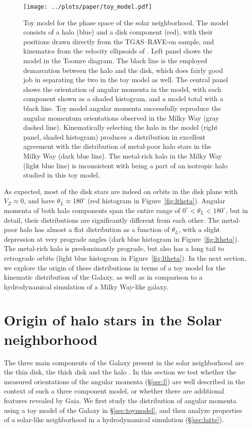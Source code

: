 \documentclass[apj, twocolappendix, numberedappendix, appendixfloats]{emulateapj}
\begin{document}
\begin{figure*}
\begin{center}
\texttt{[image: ../plots/paper/toy\_model.pdf]}
\caption{Toy model for the phase space of the solar neighborhood.
The model consists of a halo (blue) and a disk component (red), with their positions drawn directly from the TGAS--RAVE-on sample, and kinematics from the velocity ellipsoids of \citet{bensby2003}.
Left panel shows the model in the Toomre diagram.
The black line is the employed demarcation between the halo and the disk, which does fairly good job in separating the two in the toy model as well.
The central panel shows the orientation of angular momenta in the model, with each component shown as a shaded histogram, and a model total with a black line.
Toy model angular momenta successfully reproduce the angular momentum orientations observed in the Milky Way (gray dashed line).
Kinematically selecting the halo in the model (right panel, shaded histogram) produces a distribution in excellent agreement with the distribution of metal-poor halo stars in the Milky Way (dark blue line).
The metal-rich halo in the Milky Way (light blue line) is inconsistent with being a part of an isotropic halo studied in this toy model.}
\label{fig:toy}
\end{center}
\end{figure*}

As expected, most of the disk stars are indeed on orbits in the disk plane with $V_Z\approx0$, and have $\theta_L\approx180^\circ$ (red histogram in Figure~\ref{fig:ltheta}).
Angular momenta of both halo components span the entire range of $0^\circ<\theta_L<180^\circ$, but in detail, their distributions are significantly different from each other.
The metal-poor halo has almost a flat distribution as a function of $\theta_L$, with a slight depression at very prograde angles (dark blue histogram in Figure~\ref{fig:ltheta}).
The metal-rich halo is predominantly prograde, but also has a long tail to retrograde orbits (light blue histogram in Figure~\ref{fig:ltheta}).
In the next section, we explore the origin of these distributions in terms of a toy model for the kinematic distribution of the Galaxy, as well as in comparison to a hydrodynamical simulation of a Milky Way-like galaxy.

\section{Origin of halo stars in the Solar neighborhood}
The three main components of the Galaxy present in the solar neighborhood are the thin disk, the thick disk and the halo \citep[e.g.,][]{bhg2016}.
In this section we test whether the measured orientations of the angular momenta (\S\ref{sec:l}) are well described in the context of such a three component model, or whether there are additional features revealed by Gaia.
We first study the distribution of angular momenta using a toy model of the Galaxy in \S\ref{sec:toymodel}, and then analyze properties of a solar-like neighborhood in a hydrodynamical simulation (\S\ref{sec:latte}).
\end{document}
